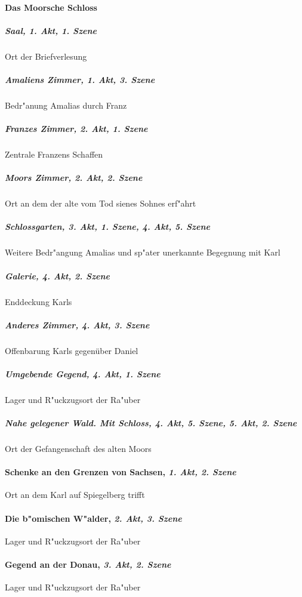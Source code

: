 \paragraph{Das Moorsche Schloss}
	\subparagraph{Saal, \textit{1. Akt, 1. Szene}}
		Ort der Briefverlesung
	\subparagraph{Amaliens Zimmer, \textit{1. Akt, 3. Szene}}
		Bedr"anung Amalias durch Franz
	\subparagraph{Franzes Zimmer, \textit{2. Akt, 1. Szene}}
		Zentrale Franzens Schaffen
	\subparagraph{Moors Zimmer, \textit{2. Akt, 2. Szene}}
		Ort an dem der alte vom Tod sienes Sohnes erf"ahrt
	\subparagraph{Schlossgarten, \textit{3. Akt, 1. Szene}, \textit{4. Akt, 5. Szene}}
		Weitere Bedr"angung Amalias und sp"ater unerkannte Begegnung mit Karl
	\subparagraph{Galerie, \textit{4. Akt, 2. Szene}}
		Enddeckung Karls
	\subparagraph{Anderes Zimmer, \textit{4. Akt, 3. Szene}}
		Offenbarung Karls gegenüber Daniel
	\subparagraph{Umgebende Gegend, \textit{4. Akt, 1. Szene}}
		Lager und R"uckzugsort der Ra"uber
	\subparagraph{Nahe gelegener Wald. Mit Schloss, \textit{4. Akt, 5. Szene}, \textit{5. Akt, 2. Szene}}
		Ort der Gefangenschaft des alten Moors
\paragraph{Schenke an den Grenzen von Sachsen, \textit{1. Akt, 2. Szene}}
Ort an dem Karl auf Spiegelberg trifft
\paragraph{Die b"omischen W"alder, \textit{2. Akt, 3. Szene}}
Lager und R"uckzugsort der Ra"uber
\paragraph{Gegend an der Donau, \textit{3. Akt, 2. Szene}}
Lager und R"uckzugsort der Ra"uber
